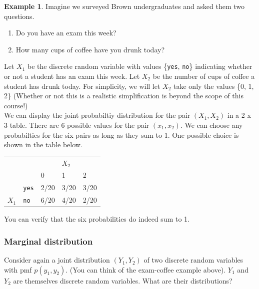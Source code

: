 \documentclass[12pt]{article}
\theoremstyle{definition}
\newtheorem*{example}{Example}
\theoremstyle{remark}
\begin{document}
\begin{example}Imagine we surveyed Brown undergraduates and asked them two questions. 
\begin{enumerate}
\item Do you have an exam this week? 
\item How many cups of coffee have you drunk today?
\end{enumerate}
Let $X_1$ be the discrete random variable with values \{\texttt{yes}, \texttt{no}\} indicating whether or not a student has an exam this week. Let $X_2$ be the number of cups of coffee a student has drunk today. For simplicity, we will let $X_2$ take only the values \{0, 1, 2\} (Whether or not this is a realistic simplification is beyond the scope of this course!)\\

We can display the joint probabiltiy distribution for the pair $(X_1, X_2)$ in a 2 x 3 table. There are 6 possible values for the pair $(x_1, x_2)$. We can choose any probabilties for the six pairs as long as they sum to 1. One possible choice is shown in the table below.

\begin{table}[H]
\centering
\begin{tabular}{lllll}
                       &                                 &      & $X_2$    &                           \\ \cline{3-5}
                       &                                 & 0    & 1    & 2                         \\ \cline{3-5}
\multicolumn{1}{l|}{}  & \multicolumn{1}{l|}{\texttt{yes}}    & 2/20 & 3/20 & \multicolumn{1}{l|}{3/20} \\
\multicolumn{1}{l|}{$X_1$} & \multicolumn{1}{l|}{\texttt{no}} & 6/20 & 4/20 & \multicolumn{1}{l|}{2/20} \\ \cline{3-5}                  
\end{tabular}
\end{table}
You can verify that the six probabilities do indeed sum to 1.
\end{example}

\subsubsection{Marginal distribution}
Consider again a joint distribution $(Y_1, Y_2)$ of two discrete random variables with pmf $p(y_1, y_2)$. (You can think of the exam-coffee example above). $Y_1$ and $Y_2$ are themselves discrete random variables. What are their distributions? \\
\end{document}
